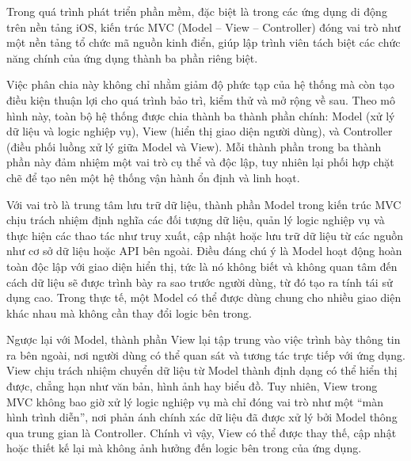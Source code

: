     \hspace*{0.8cm}Trong quá trình phát triển phần mềm, đặc biệt là trong các ứng dụng di động trên nền tảng iOS, kiến trúc MVC (Model – View – Controller) đóng vai trò như một nền tảng tổ chức mã nguồn kinh điển, giúp lập trình viên tách biệt các chức năng chính của ứng dụng thành ba phần riêng biệt.
    \vspace{0.5em}
    
      \hspace*{0.8cm}Việc phân chia này không chỉ nhằm giảm độ phức tạp của hệ thống mà còn tạo điều kiện thuận lợi cho quá trình bảo trì, kiểm thử và mở rộng về sau. Theo mô hình này, toàn bộ hệ thống được chia thành ba thành phần chính: Model (xử lý dữ liệu và logic nghiệp vụ), View (hiển thị giao diện người dùng), và Controller (điều phối luồng xử lý giữa Model và View). Mỗi thành phần trong ba thành phần này đảm nhiệm một vai trò cụ thể và độc lập, tuy nhiên lại phối hợp chặt chẽ để tạo nên một hệ thống vận hành ổn định và linh hoạt.
    \vspace{0.5em}

    
      \hspace*{0.8cm}Với vai trò là trung tâm lưu trữ dữ liệu, thành phần Model trong kiến trúc MVC chịu trách nhiệm định nghĩa các đối tượng dữ liệu, quản lý logic nghiệp vụ và thực hiện các thao tác như truy xuất, cập nhật hoặc lưu trữ dữ liệu từ các nguồn như cơ sở dữ liệu hoặc API bên ngoài. Điều đáng chú ý là Model hoạt động hoàn toàn độc lập với giao diện hiển thị, tức là nó không biết và không quan tâm đến cách dữ liệu sẽ được trình bày ra sao trước người dùng, từ đó tạo ra tính tái sử dụng cao. Trong thực tế, một Model có thể được dùng chung cho nhiều giao diện khác nhau mà không cần thay đổi logic bên trong.
    \vspace{0.5em}

    
      \hspace*{0.8cm}Ngược lại với Model, thành phần View lại tập trung vào việc trình bày thông tin ra bên ngoài, nơi người dùng có thể quan sát và tương tác trực tiếp với ứng dụng. View chịu trách nhiệm chuyển dữ liệu từ Model thành định dạng có thể hiển thị được, chẳng hạn như văn bản, hình ảnh hay biểu đồ. Tuy nhiên, View trong MVC không bao giờ xử lý logic nghiệp vụ mà chỉ đóng vai trò như một “màn hình trình diễn”, nơi phản ánh chính xác dữ liệu đã được xử lý bởi Model thông qua trung gian là Controller. Chính vì vậy, View có thể được thay thế, cập nhật hoặc thiết kế lại mà không ảnh hưởng đến logic bên trong của ứng dụng.
    \vspace{0.5em}

